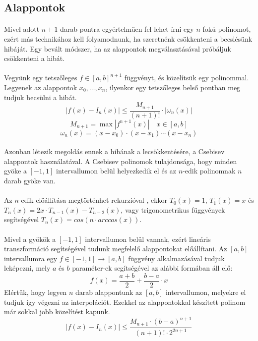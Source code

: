 \documentclass{elteikthesis}
\begin{document}
\subsection{Alappontok}
\paragraph{}
Mivel adott $n+1$ darab pontra egyértelműen fel lehet írni egy $n$ fokú polinomot, ezért más technikához kell folyamodnunk, ha szeretnénk csökkenteni a becslésünk hibáját. Egy bevált módszer, ha az alappontok megválasztásával próbáljuk csökkenteni a hibát.
\paragraph{}
Vegyünk egy tetszőleges $f \in [a,b]^{n+1}$ függvényt, és közelítsük egy polinommal. Legyenek az alappontok $x_0, \dots, x_n$, ilyenkor egy tetszőleges belső pontban meg tudjuk becsülni a hibát. $$|f(x) - I_n(x)| \leq \frac{M_{n+1}}{(n+1)!} \cdot |\omega_n(x)|$$
$$M_{n+1} = \max |f^{n+1}(x)| \quad x \in [a,b]$$
$$\omega_n(x) = (x-x_0)\cdot(x-x_1)\cdots(x-x_n)$$
\paragraph{}
Azonban létezik megoldás ennek a hibának a lecsökkentésére, a Csebisev alappontok használatával. A Csebisev polinomok tulajdonsága, hogy minden gyöke a $[-1,1]$ intervallumon belül helyezkedik el és az $n$-edik polinomnak $n$ darab gyöke van.
\paragraph{}
Az $n$-edik előállítása megtörténhet rekurzióval , ekkor $T_0(x)=1$, $T_1(x) = x$ és $T_n(x) = 2x \cdot T_{n-1}(x)-T_{n-2}(x)$, vagy trigonometrikus függvények segítségével $T_n(x) = cos(n \cdot arccos(x))$.
\paragraph{}
Mivel a gyökök a $[-1, 1]$ intervallumon belül vannak, ezért lineáris transzformáció segítségével tudunk megfelelő alappontokat előállítani. Az $[a,b]$ intervallumra egy $f \in [-1,1] \rightarrow [a,b]$ függvény alkalmazásával tudjuk leképezni, mely $a$ és $b$ paraméter-ek segítségével az alábbi formában áll elő:
$$f(x) = \frac{a+b}{2}+\frac{b-a}{2} \cdot x$$
Elértük, hogy legyen $n$ darab alappontunk az $[a,b]$ intervallumon, melyekre el tudjuk így végezni az interpolációt. Ezekkel az alappontokkal készített polinom már sokkal jobb közelítést kapunk. $$|f(x)-I_n(x)| \leq \frac{M_{n+1}\cdot(b-a)^{n+1}}{(n+1)! \cdot 2^{2n+1}}$$
\end{document}
